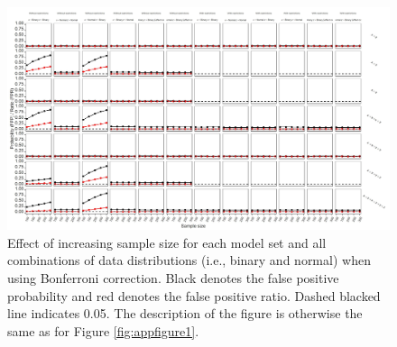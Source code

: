 \begin{landscape}
\begin{figure}[hbt!]
\includegraphics[scale=0.75]{R/Analysis/Result/Figures/Figure1DSIBon.jpeg}
\centering
\caption{Effect of increasing sample size for each model set and all combinations of data distributions (i.e., binary and normal) when using Bonferroni correction. Black denotes the false positive probability and red denotes the false positive ratio. Dashed blacked line indicates 0.05. The description of the figure is otherwise the same as for Figure \ref{fig:appfigure1}.}
\label{fig:appfigure12}
\end{figure}
\end{landscape}
